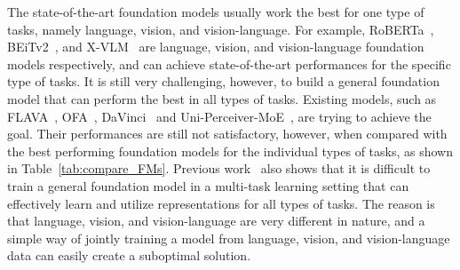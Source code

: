 \documentclass[11pt]{article}
\begin{document}
The state-of-the-art foundation models usually work the best for one type of tasks, namely language, vision, and vision-language. For example, RoBERTa~\citep{liu2019roberta}, BEiTv2~\citep{peng2022beit}, and X-VLM~\citep{zeng2021multi,zeng2022x} are language, vision, and vision-language foundation models respectively, and can achieve state-of-the-art performances for the specific type of tasks. It is still very challenging, however, to build a general foundation model that can perform the best in all types of tasks. Existing models, such as FLAVA~\citep{singh2021flava}, OFA~\citep{wang2022ofa}, DaVinci~\citep{diao2022prefix} and Uni-Perceiver-MoE~\citep{zhu2022uni}, are trying to achieve the goal. Their performances are still not satisfactory, however, when compared with the best performing foundation models for the individual types of tasks, as shown in Table~\ref{tab:compare_FMs}. Previous work~\cite {bingel2017identifying,wang2020makes} also shows that it is difficult to train a general foundation model in a multi-task learning setting that can effectively learn and utilize representations for all types of tasks. The reason is that language, vision, and vision-language are very different in nature, and a simple way of jointly training a model from language, vision, and vision-language data can easily create a suboptimal solution. 
\end{document}
